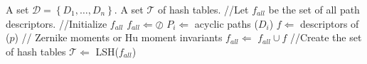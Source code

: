 \begin{algorithmbis}
\label{algo:hssg:hashtables}
\begin{algorithmic}
\REQUIRE A set $\mathcal{D}=\left\{D_1,\ldots,D_n\right\}$.
\ENSURE A set $\mathcal{T}$ of hash tables.
\STATE //Let $f_{all}$ be the set of all path descriptors.
\STATE //Initialize $f_{all}$
\STATE $f_{all}\Leftarrow\oslash$
	\STATE $P_i\Leftarrow$ acyclic paths ($D_i$)
		\STATE $f\Leftarrow$ descriptors of ($p$) // Zernike moments or Hu moment invariants
		\STATE $f_{all}\Leftarrow$ $f_{all} \cup f$
	\ENDFOR
\ENDFOR
\STATE //Create the set of hash tables
\STATE $\mathcal{T}\Leftarrow$ LSH($f_{all}$)
\end{algorithmic}
\end{algorithmbis}

